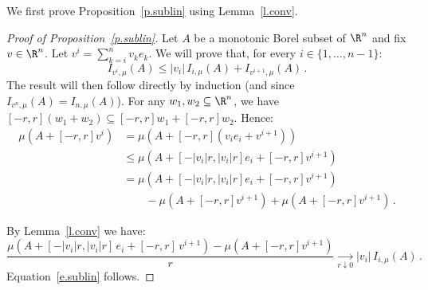 We first prove Proposition~\ref{p.sublin} using Lemma~\ref{l.conv}.

\begin{proof}[Proof of Proposition~\ref{p.sublin}]
Let $A$ be a monotonic Borel subset of $\R^n$ and fix $v \in \R^n$. Let $v^i=\sum_{k=i}^n v_k e_k$. We will prove that, for every $i \in \{ 1,\dots, n-1 \}$:
\begin{equation}\label{e.sublin}
I_{v^i,\mu}(A) \leq |v_i| \, I_{i,\mu}(A) + I_{v^{i+1},\mu}(A) \,.
\end{equation}
The result will then follow directly by induction (and since $I_{v^{n},\mu}(A)= I_{n,\mu}(A)$). For any $w_1,w_2 \subseteq \R^n$, we have $[-r,r](w_1+w_2) \subseteq [-r,r]w_1+[-r,r]w_2$. Hence:
\begin{align*}
\mu \left(A + [-r,r]v^i \right) &=\mu \left(A + [-r,r] \left(v_i e_i + v^{i+1} \right) \right)\\
&\leq \mu \left(A + [-|v_i| r,|v_i| r] e_i + [-r,r] v^{i+1} \right)\\
&= \mu \left(A + [-|v_i| r,|v_i| r] e_i + [-r,r] v^{i+1} \right)\\
&\qquad - \mu \left(A + [-r,r] v^{i+1} \right) + \mu \left(A + [-r,r] v^{i+1} \right) \,.
\end{align*}

By Lemma~\ref{l.conv} we have:
\[
\frac{\mu \left(A + [-|v_i| r,|v_i| r] \, e_i + [-r,r] \, v^{i+1} \right) - \mu \left(A + [-r,r]v^{i+1} \right)}{r} \underset{r \downarrow 0}{\longrightarrow} |v_i| \, I_{i,\mu}(A) \,.
\]
Equation~\eqref{e.sublin} follows.
\end{proof}

